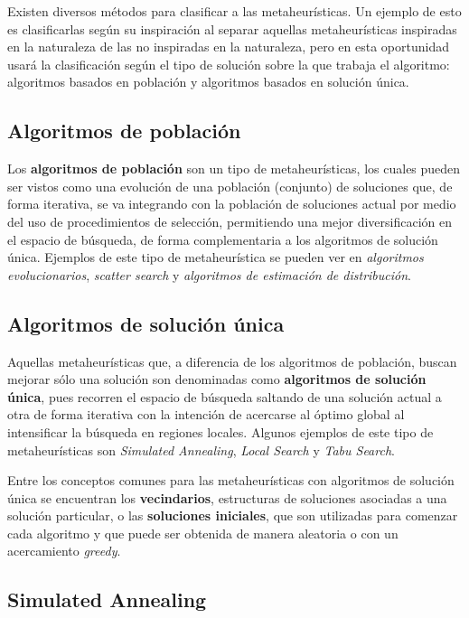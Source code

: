 Existen diversos métodos para clasificar a las metaheurísticas. Un ejemplo de esto es clasificarlas según su inspiración al separar aquellas metaheurísticas inspiradas en la naturaleza de las no inspiradas en la naturaleza, pero en esta oportunidad usará la clasificación según el tipo de solución sobre la que trabaja el algoritmo: algoritmos basados en población y algoritmos basados en solución única.

\subsection{Algoritmos de población}

Los \textbf{algoritmos de población} son un tipo de metaheurísticas, los cuales pueden ser vistos como una evolución de una población (conjunto) de soluciones que, de forma iterativa, se va integrando con la población de soluciones actual por medio del uso de procedimientos de selección, permitiendo una mejor diversificación en el espacio de búsqueda, de forma complementaria a los algoritmos de solución única. Ejemplos de este tipo de metaheurística se pueden ver en \textit{algoritmos evolucionarios}, \textit{scatter search} y \textit{algoritmos de estimación de distribución}.

\subsection{Algoritmos de solución única}

Aquellas metaheurísticas que, a diferencia de los algoritmos de población, buscan mejorar sólo una solución son denominadas como \textbf{algoritmos de solución única}, pues recorren el espacio de búsqueda saltando de una solución actual a otra de forma iterativa con la intención de acercarse al óptimo global al intensificar la búsqueda en regiones locales. Algunos ejemplos de este tipo de metaheurísticas son \textit{Simulated Annealing}, \textit{Local Search} y \textit{Tabu Search}.

Entre los conceptos comunes para las metaheurísticas con algoritmos de solución única se encuentran los \textbf{vecindarios}, estructuras de soluciones asociadas a una solución particular, o las \textbf{soluciones iniciales}, que son utilizadas para comenzar cada algoritmo y que puede ser obtenida de manera aleatoria o con un acercamiento \textit{greedy}.

\subsection{Simulated Annealing}

